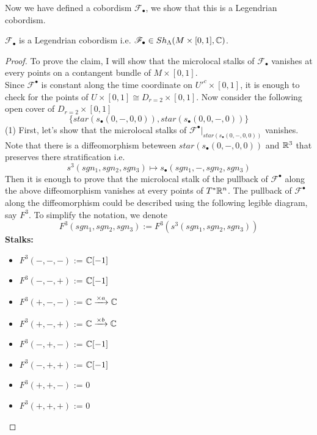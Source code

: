 Now we have defined a cobordism $\mathscr{F}_\bullet$, we show that this is a Legendrian cobordism.
\begin{proposition}
$\mathscr{F}_\bullet$ is a Legendrian cobordism i.e. $\mathscr{F}_\bullet \in Sh_\Lambda(M \times [0,1],\mathbb{C})$.
\end{proposition}
\begin{proof}
To prove the claim, I will show that the microlocal stalks of $\mathscr{F}_\bullet$ vanishes at every points on a contangent bundle of $M\times [0,1]$.\\
Since $\mathscr{F}^\bullet$ is constant along the time coordinate on $U'^c \times [0,1]$, it is enough to check for the points of $U\times [0,1] \cong D_{r=2}\times [0,1]$. Now consider the following open cover of $D_{r=2}\times [0,1]$
\[
\{star(s_\bullet(0,-,0,0)),star(s_\bullet(0,0,-,0))\}
\] 
(1) First, let's show that the microlocal stalks of $\mathscr{F}^\bullet|_{star(s_\bullet(0,-,0,0))}$ vanishes. Note that there is a diffeomorphism beteween $star(s_\bullet(0,-,0,0))$ and $\mathbb{R}^3$ that preserves there stratification i.e.
\[
s^3(sgn_1,sgn_2,sgn_3) \mapsto s_\bullet(sgn_1,-,sgn_2,sgn_3)
\]
Then it is enough to prove that the microlocal stalk of the pullback of $\mathscr{F}^\bullet$ along the above diffeomorphism vanishes at every points of $T^*\mathbb{R}^n$. The pullback of $\mathscr{F}^\bullet$ along the diffeomorphism could be described using the following legible diagram, say $F^3$. To simplify the notation, we denote
\[
F^3(sgn_1,sgn_2,sgn_3):= F^3(s^3(sgn_1,sgn_2,sgn_3))
\]
\textbf{Stalks:}
\begin{itemize}
\item $F^3(-,-,-)$ := $\mathbb{C}[-1]$
\item $F^3(-,-,+)$ := $\mathbb{C}[-1]$
\item $F^3(+,-,-)$ := $\mathbb{C}\xrightarrow{\times a} \mathbb{C}$
\item $F^3(+,-,+)$ := $\mathbb{C}\xrightarrow{\times b} \mathbb{C}$
\item $F^3(-,+,-)$ := $\mathbb{C}[-1]$
\item $F^3(-,+,+)$ := $\mathbb{C}[-1]$
\item $F^3(+,+,-)$ := $0$
\item $F^3(+,+,+)$ := $0$
\end{itemize}


\end{proof}
